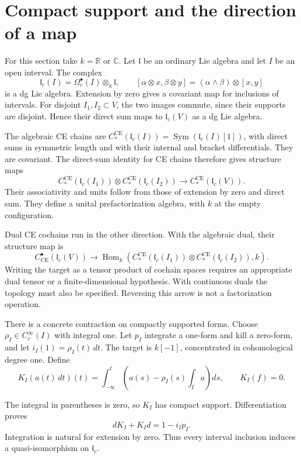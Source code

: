 \section{Compact support and the direction of a map}

For this section take $k=\mathbb R$ or $\mathbb C$.
Let $\mathfrak l$ be an ordinary Lie algebra and let $I$ be an
open interval. The complex
\[
 \mathfrak l_c(I)=\Omega_c^\bullet(I)\otimes_k\mathfrak l,
 \qquad[\alpha\otimes x,\beta\otimes y]
                   =(\alpha\wedge\beta)\otimes[x,y]
\]
is a dg Lie algebra. Extension by zero gives a covariant map
for inclusions of intervals. For disjoint $I_1,I_2\subset V$,
the two images commute, since their supports are disjoint.
Hence their direct sum maps to $\mathfrak l_c(V)$ as a dg Lie
algebra.

The algebraic CE chains are
$C_*^{\mathrm{CE}}(\mathfrak l_c(I))
=\operatorname{Sym}(\mathfrak l_c(I)[1])$, with direct sums in
symmetric length and with their internal and bracket
differentials. They are covariant. The direct-sum identity for
CE chains therefore gives structure maps
\[
 C_*^{\mathrm{CE}}(\mathfrak l_c(I_1))\otimes
 C_*^{\mathrm{CE}}(\mathfrak l_c(I_2))
 \longrightarrow C_*^{\mathrm{CE}}(\mathfrak l_c(V)).
\]
Their associativity and units follow from those of extension by
zero and direct sum. They define a unital prefactorization
algebra, with $k$ at the empty configuration.

Dual CE cochains run in the other direction. With the algebraic
dual, their structure map is
\[
 C^{\bullet}_{\mathrm{CE}}(\mathfrak l_c(V))
 \longrightarrow
 \operatorname{Hom}_k\left(
 C_*^{\mathrm{CE}}(\mathfrak l_c(I_1))\otimes
 C_*^{\mathrm{CE}}(\mathfrak l_c(I_2)),k\right).
\]
Writing the target as a tensor product of cochain spaces
requires an appropriate dual tensor or a finite-dimensional
hypothesis. With continuous duals the topology must also be
specified. Reversing this arrow is not a factorization
operation.

There is a concrete contraction on compactly supported forms.
Choose $\rho_I\in C_c^\infty(I)$ with integral one. Let $p_I$
integrate a one-form and kill a zero-form, and let
$i_I(1)=\rho_I(t)\,dt$. The target is $k[-1]$, concentrated in
cohomological degree one. Define
\[
 K_I(a(t)\,dt)(t)
 =\int_{-\infty}^t\left(a(s)-\rho_I(s)\int_Ia\right)ds,
 \qquad K_I(f)=0.
\]

The integral in parentheses is zero, so $K_I$ has compact
support. Differentiation proves
\[
 dK_I+K_Id=1-i_Ip_I.
\]
Integration is natural for extension by zero. Thus every
interval inclusion induces a quasi-isomorphism on
$\mathfrak l_c$.

